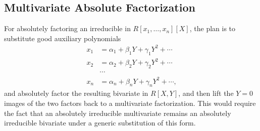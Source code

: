 \documentclass[11pt,reqno]{amsart}
\numberwithin{equation}{section}
\begin{document}
\subsection{Multivariate Absolute Factorization}
For absolutely factoring  an irreducible in $R[x_1,\dots,x_n][X]$, the plan is
to substitute good auxiliary polynomials
\begin{align*}
x_1 &= \alpha_1 + \beta_1 Y + \gamma_1 Y^2 + \cdots\\
x_2 &= \alpha_2 + \beta_2 Y + \gamma_2 Y^2 + \cdots\\
&\cdots\\
x_n &= \alpha_n + \beta_n Y + \gamma_n Y^2 + \cdots\text{,}
\end{align*}
and absolutely factor the resulting bivariate in $R[X,Y]$, and then lift the
$Y=0$ images of the two factors back to a multivariate factorization. This
would require the fact that an absolutely irreducible multivariate remains an
absolutely irreducible bivariate under a generic substitution of this form.
\end{document}
